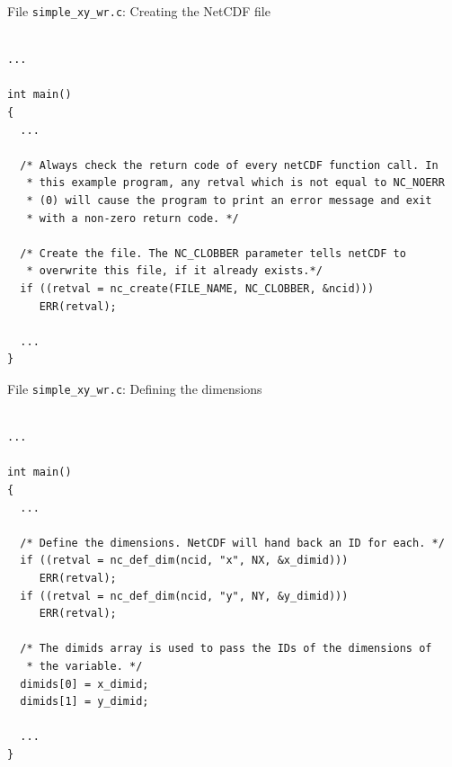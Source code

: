 \documentclass[compress,11pt,xcolor=svgnames,aspectratio=169]{beamer}
\begin{document}
\begin{frame}[fragile]{File \texttt{simple\_xy\_wr.c}: Creating the NetCDF file}

{\tiny

\begin{verbatim}

...

int main()
{
  ...

  /* Always check the return code of every netCDF function call. In
   * this example program, any retval which is not equal to NC_NOERR
   * (0) will cause the program to print an error message and exit
   * with a non-zero return code. */

  /* Create the file. The NC_CLOBBER parameter tells netCDF to
   * overwrite this file, if it already exists.*/
  if ((retval = nc_create(FILE_NAME, NC_CLOBBER, &ncid)))
     ERR(retval);

  ...
}

\end{verbatim}

}

\end{frame}

\begin{frame}[fragile]{File \texttt{simple\_xy\_wr.c}: Defining the dimensions}

{\tiny

\begin{verbatim}

...

int main()
{
  ...

  /* Define the dimensions. NetCDF will hand back an ID for each. */
  if ((retval = nc_def_dim(ncid, "x", NX, &x_dimid)))
     ERR(retval);
  if ((retval = nc_def_dim(ncid, "y", NY, &y_dimid)))
     ERR(retval);

  /* The dimids array is used to pass the IDs of the dimensions of
   * the variable. */
  dimids[0] = x_dimid;
  dimids[1] = y_dimid;

  ...
}

\end{verbatim}

}

\end{frame}
\end{document}
